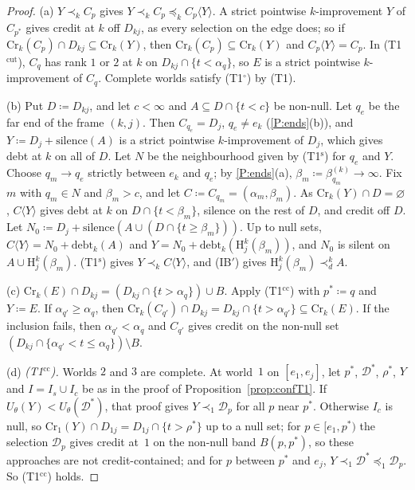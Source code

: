 \documentclass[11pt]{article}
\theoremstyle{definition}\newtheorem{definition}[theorem]{Definition}
\theoremstyle{remark}\newtheorem{remark}[theorem]{Remark}
\newcommand{\Dscr}{\mathcal D}
\newcommand{\debt}{\mathrm{debt}}
\newcommand{\sil}{\mathrm{silence}}
\newcommand{\Hi}[3]{\mathrm H^{#1}_{#2}(#3)}
\newcommand{\To}{\textup{(T1$^\circ$)}}
\newcommand{\Ts}{\textup{(T1$^{\mathrm s}$)}}
\newcommand{\Tcc}{\textup{(T1$^{\mathrm{cc}}$)}}
\newcommand{\Tcut}{\textup{(T1$^{\mathrm{cut}}$)}}
\begin{document}
\begin{proof}
(a) $Y\prec_kC_p$ gives $Y\prec_kC_p\preceq_kC_p\langle Y\rangle$. A strict
pointwise $k$-improvement $Y$ of $C_{p^*}$ gives credit at $k$ off
$D_{kj}$, as every selection on the edge does; so if
$\mathrm{Cr}_k(C_p)\cap D_{kj}\subseteq\mathrm{Cr}_k(Y)$, then
$\mathrm{Cr}_k(C_p)\subseteq\mathrm{Cr}_k(Y)$ and $C_p\langle Y\rangle=C_p$.
In \Tcut, $C_q$ has rank $1$ or $2$ at $k$ on $D_{kj}\cap\{t<\alpha_q\}$, so
$E$ is a strict pointwise $k$-improvement of $C_q$. Complete worlds satisfy
\To{} by (T1).

(b) Put $D\coloneqq D_{kj}$, and let $c<\infty$ and $A\subseteq
D\cap\{t<c\}$ be non-null. Let $q_e$ be the far end of the frame $(k,j)$. Then
$C_{q_e}=D_j$, $q_e\ne e_k$ (\ref{P:ends}(b)), and $Y\coloneqq D_j+\sil(A)$
is a strict pointwise $k$-improvement of $D_j$, which gives debt at $k$ on
all of $D$. Let $N$ be the neighbourhood given by \Ts{} for $q_e$ and $Y$.
Choose $q_m\to q_e$ strictly between $e_k$ and $q_e$; by \ref{P:ends}(a),
$\beta_m\coloneqq\beta^{(k)}_{q_m}\to\infty$. Fix $m$ with $q_m\in N$ and
$\beta_m>c$, and let $C\coloneqq C_{q_m}=(\alpha_m,\beta_m)$. As
$\mathrm{Cr}_k(Y)\cap D=\varnothing$, $C\langle Y\rangle$ gives debt at $k$
on $D\cap\{t<\beta_m\}$, silence on the rest of $D$, and credit off $D$. Let
$N_0\coloneqq D_j+\sil(A\cup(D\cap\{t\ge\beta_m\}))$. Up to null sets,
$C\langle Y\rangle=N_0+\debt_k(A)$ and $Y=N_0+\debt_k(\Hi kj{\beta_m})$, and
$N_0$ is silent on $A\cup\Hi kj{\beta_m}$. \Ts{} gives $Y\prec_kC\langle
Y\rangle$, and (IB$'$) gives $\Hi kj{\beta_m}\prec^k_dA$.

(c) $\mathrm{Cr}_k(E)\cap D_{kj}=(D_{kj}\cap\{t>\alpha_q\})\cup B$. Apply
\Tcc{} with $p^*\coloneqq q$ and $Y\coloneqq E$. If $\alpha_{q'}\ge
\alpha_q$, then $\mathrm{Cr}_k(C_{q'})\cap D_{kj}=D_{kj}\cap\{t>
\alpha_{q'}\}\subseteq\mathrm{Cr}_k(E)$. If the inclusion fails, then
$\alpha_{q'}<\alpha_q$ and $C_{q'}$ gives credit on the non-null set
$(D_{kj}\cap\{\alpha_{q'}<t\le\alpha_q\})\setminus B$.

(d) \emph{\Tcc.} Worlds $2$ and $3$ are complete. At world~$1$ on
$[e_1,e_j]$, let $p^*$, $\Dscr^*$, $\rho^*$, $Y$ and $I=I_s\cup I_c$ be as in
the proof of Proposition~\ref{prop:confT1}. If $U_\theta(Y)<
U_\theta(\Dscr^*)$, that proof gives $Y\prec_1\Dscr_p$ for all $p$ near
$p^*$. Otherwise $I_c$ is null, so $\mathrm{Cr}_1(Y)\cap D_{1j}=D_{1j}\cap
\{t>\rho^*\}$ up to a null set; for $p\in[e_1,p^*)$ the selection $\Dscr_p$
gives credit at~$1$ on the non-null band $B(p,p^*)$, so these approaches are
not credit-contained; and for $p$ between $p^*$ and $e_j$,
$Y\prec_1\Dscr^*\preceq_1\Dscr_p$. So \Tcc{} holds.


\end{proof}
\end{document}
